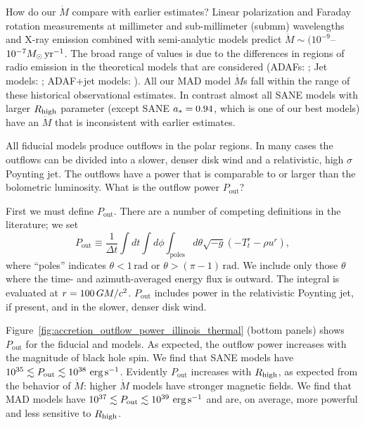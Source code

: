 How do our $\dot{M}$ compare with earlier estimates?
Linear polarization and Faraday rotation measurements at millimeter and sub-millimeter (submm) wavelengths \citep{2000ApJ...538L.121A, 2000ApJ...545..842Q, 2003ApJ...588..331B, 2006ApJ...640..308M, 2006JPhCS..54..354M, 2006ApJ...646L.111M} and X-ray emission \citep{2003ApJ...591..891B, doi:10.1126/science.1240755} combined  with semi-analytic models predict $\dot{M} \sim (10^{-9}$--$10^{-7} M_{\odot}\,\mathrm{yr}^{-1}$.
The broad range of values is due to the differences in regions of radio emission in the theoretical models that are considered (ADAFs: \citealt{1998ApJ...492..554N, Yuan_2003}; Jet models: \citealt{1993A&A...278L...1F, 2000A&A...362..113F}; ADAF+jet models: \citealt{2002A&A...383..854Y}).
All our MAD model $\dot{M}$s fall within the range of these historical observational estimates.
In contrast almost all SANE models with larger $R_\mathrm{high}$ parameter (except SANE $a_*=0.94$, which is one of our best models) have an $\dot{M}$ that is inconsistent with earlier estimates.

All fiducial models produce outflows in the polar regions.
In many cases the outflows can be divided into a slower, denser disk wind and a relativistic, high $\sigma$ Poynting jet.
The outflows have a power that is comparable to or larger than the bolometric luminosity.
What is the outflow power $P_\mathrm{out}$?

First we must define $P_\mathrm{out}$.
There are a number of competing definitions in the literature; we set
\begin{equation}
  P_\mathrm{out} \equiv \frac{1}{\Delta t}\int dt \int d\phi \int_\mathrm{poles} d\theta \sqrt{-g}\left(-T^{r}_{t}-\rho u^{r}\right),
\end{equation}
where ``poles'' indicates $\theta < 1\,\mathrm{rad}$ or $\theta > (\pi-1)\,\mathrm{rad}$.  We include only those $\theta$ where the time- and azimuth-averaged energy flux is outward.
The integral is evaluated at $r = 100\,GM/c^2$.
$P_\mathrm{out}$ includes power in the relativistic Poynting jet, if present, and in the slower, denser disk wind.

Figure~\ref{fig:accretion_outflow_power_illinois_thermal} (bottom panels) shows $P_\mathrm{out}$ for the fiducial \kharma and \bhac models.
As expected, the outflow power increases with the magnitude of black hole spin.
We find that SANE models have $10^{35} \lesssim P_\mathrm{out} \lesssim 10^{38} \,\,\mathrm{erg}\,\mathrm{s}^{-1}$.
Evidently $P_\mathrm{out}$ increases with $R_\mathrm{high}$, as expected from the behavior of $\dot{M}$: higher $\dot{M}$ models have stronger magnetic fields.
We find that MAD models have $10^{37} \lesssim P_\mathrm{out} \lesssim 10^{39}\,\,\mathrm{erg}\,\mathrm{s}^{-1}$ and are, on average, more powerful and less sensitive to $R_\mathrm{high}$.

